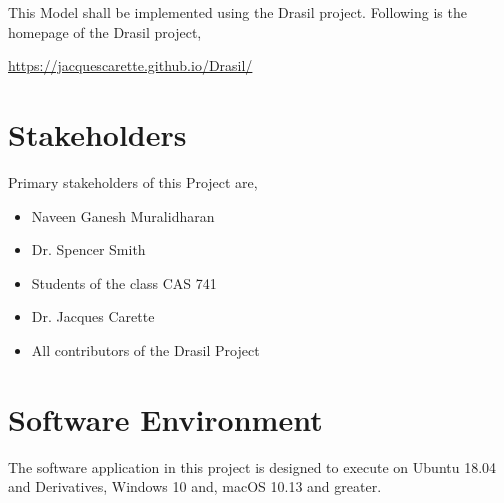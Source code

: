 \documentclass{article}
\begin{document}
This Model shall be implemented using the Drasil project. Following is the 
homepage of the Drasil project,

\url{https://jacquescarette.github.io/Drasil/} 

\section*{Stakeholders}
Primary stakeholders of this Project are,
\begin{itemize}
\item Naveen Ganesh Muralidharan
\item Dr. Spencer Smith
\item Students of the class CAS 741
\item Dr. Jacques Carette
\item All contributors of the Drasil Project
\end{itemize}

\section*{Software Environment}
The software application in this project is designed to execute on Ubuntu 18.04 
and Derivatives, Windows 10 and, macOS 10.13 and greater.



\end{document}
